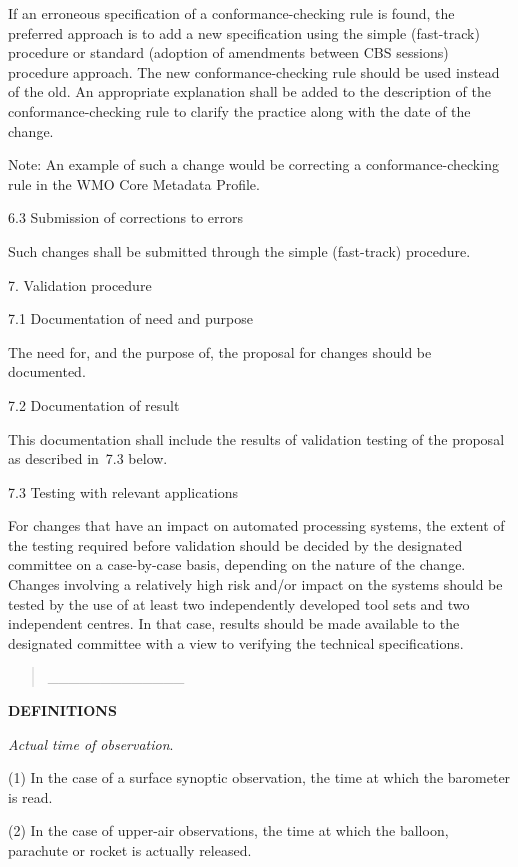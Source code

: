 If an erroneous specification of a conformance-checking rule is found, the preferred approach is to add a new specification using the simple (fast-track) procedure or standard (adoption of amendments between CBS sessions) procedure approach. The new conformance-checking rule should be used instead of the old. An appropriate explanation shall be added to the description of the conformance-checking rule to clarify the practice along with the date of the change.

Note: An example of such a change would be correcting a conformance-checking rule in the WMO Core Metadata Profile.

6.3 Submission of corrections to errors

Such changes shall be submitted through the simple (fast-track) procedure.

7. Validation procedure

7.1 Documentation of need and purpose

The need for, and the purpose of, the proposal for changes should be documented.

7.2 Documentation of result

This documentation shall include the results of validation testing of the proposal as described in~7.3 below.

7.3 Testing with relevant applications

For changes that have an impact on automated processing systems, the extent of the testing required before validation should be decided by the designated committee on a case-by-case basis, depending on the nature of the change. Changes involving a relatively high risk and/or impact on the systems should be tested by the use of at least two independently developed tool sets and two independent centres. In that case, results should be made available to the designated committee with a view to verifying the technical specifications.

\begin{quote}
\_\_\_\_\_\_\_\_\_\_\_\_\_
\end{quote}

\textbf{DEFINITIONS}

\emph{Actual time of observation}.

(1) In the case of a surface synoptic observation, the time at which the barometer is read.

(2) In the case of upper-air observations, the time at which the balloon, parachute or rocket is actually released.

